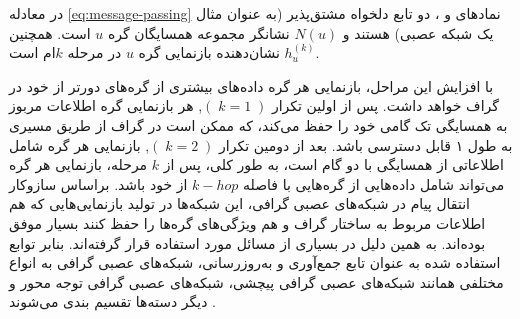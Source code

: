 در معادله \ref{eq:message-passing}  نمادهای  و ، دو تابع دلخواه مشتق‌پذیر (به عنوان مثال یک شبکه عصبی) هستند و $N(u)$ نشانگر مجموعه همسایگان گره $u$ است. همچنین $h_u^{(k)}$ نشان‌دهنده بازنمایی گره $u$ در مرحله $k$ام است. 

با افزایش این مراحل، بازنمایی هر گره داده‌های بیشتری از گره‌های دورتر از خود در گراف خواهد داشت. پس از اولین تکرار $( \; k = 1 \;)$, هر بازنمایی گره اطلاعات مربوز به همسایگی تک گامی خود را حفظ می‌کند، که ممکن است در گراف از طریق مسیری به طول ۱ قابل دسترسی باشد\cite{rong2019dropedge}. بعد از دومین تکرار $( \; k = 2 \;)$, بازنمایی هر گره شامل اطلاعاتی از همسایگی با دو گام است، به طور کلی، پس از $k$ مرحله، بازنمایی هر گره می‌تواند شامل داده‌هایی از گره‌هایی با فاصله $k-hop$ از خود باشد. براساس سازوکار انتقال پیام در شبکه‌های عصبی گرافی، این شبکه‌ها در تولید بازنمایی‌هایی که هم اطلاعات مربوط به ساختار گراف و هم ویژگی‌های گره‌ها را حفظ کنند بسیار موفق بوده‌اند. به همین دلیل در بسیاری از مسائل مورد استفاده قرار گرفته‌اند. بنابر توابع استفاده شده به عنوان تابع جمع‌آوری و به‌روزرسانی، شبکه‌های عصبی گرافی به انواع مختلفی همانند شبکه‌های عصبی گرافی پیچشی، شبکه‌های عصبی گرافی توجه محور و دیگر دسته‌ها تقسیم بندی می‌شوند \cite{khemani2024review}.




